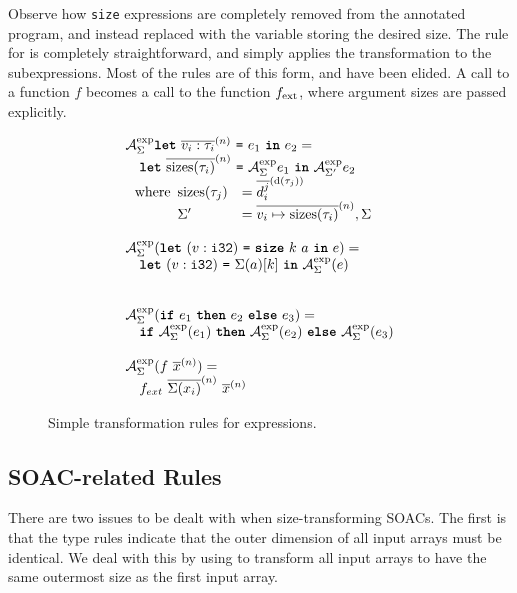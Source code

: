 Observe how \texttt{size} expressions are completely removed from the
annotated program, and instead replaced with the variable storing the
desired size.  The rule for  is completely straightforward, and
simply applies the transformation to the subexpressions.  Most of the
rules are of this form, and have been elided.  A call to a function
\(f\) becomes a call to the function \(f_{\textrm{ext}}\), where argument
sizes are passed explicitly.

\begin{figure}

\[
\begin{array}{l}
  \mathcal{A}_{\Sigma}^{\text{exp}}{\mbox{\texttt{\bfseries{let}}}~\overline{v_{i}: \tau_{i}}^{(n)}~\mbox{\texttt{=}}~e_{1}~\mbox{\texttt{\bfseries{in}}}~e_{2}} = \\
  \quad \mbox{\texttt{\bfseries{let}}}~\overline{\textrm{sizes}(\tau_{i})}^{(n)}~\mbox{\texttt{=}}~\mathcal{A}_{\Sigma}^{\text{exp}}{e_{1}}~\mbox{\texttt{\bfseries{in}}}~\mathcal{A}_{\Sigma'}^{\text{exp}}{e_{2}} \\
  ~~ \textrm{where}
  \begin{array}[t]{ll}
    \textrm{sizes}(\tau_j) &= \overline{d^{j}_{i}}^{(\textrm{d}(\tau_{j}))} \\
    \Sigma' &=\overline{v_{i}\mapsto\textrm{sizes}(\tau_{i})}^{(n)},\Sigma
  \end{array}
  \\
  \\
\mathcal{A}_{\Sigma}^{\text{exp}}(\mbox{\texttt{\bfseries{let}}}~(v: \texttt{i32})~\mbox{\texttt{=}}~\mbox{\texttt{\bfseries{size}}}~k~a~\mbox{\texttt{\bfseries{in}}}~e) = \\
\quad \mbox{\texttt{\bfseries{let}}}~(v: \texttt{i32})~\mbox{\texttt{=}}~\Sigma(a)[k]~\mbox{\texttt{\bfseries{in}}}~\mathcal{A}_{\Sigma}^{\text{exp}}(e) \\
\\
\\
\mathcal{A}_{\Sigma}^{\text{exp}}(\mbox{\texttt{\bfseries{if}}}~e_{1}~\mbox{\texttt{\bfseries{then}}}~e_{2}~\mbox{\texttt{\bfseries{else}}}~e_{3}) = \\
\quad \mbox{\texttt{\bfseries{if}}}~\mathcal{A}_{\Sigma}^{\text{exp}}(e_{1})~\mbox{\texttt{\bfseries{then}}}~\mathcal{A}_{\Sigma}^{\text{exp}}(e_{2})~\mbox{\texttt{\bfseries{else}}}~\mathcal{A}_{\Sigma}^{\text{exp}}(e_{3})
  \\
  \\
  \mathcal{A}_{\Sigma}^{\text{exp}}(f~\overline{x}^{(n)}) = \\
  \quad f_{ext}~\overline{\Sigma(x_{i})}^{(n)}~\overline{x}^{(n)}
\end{array}
\]

\caption{Simple transformation rules for expressions.}
\label{fig:simple-transformation-rules}
\end{figure}

\subsection{SOAC-related Rules}
\label{sec:SOACSizeRules}

There are two issues to be dealt with when size-transforming SOACs.
The first is that the type rules indicate that the outer dimension of
all input arrays must be identical.  We deal with this by using
 to transform all input arrays to have the same outermost
size as the first input array.

